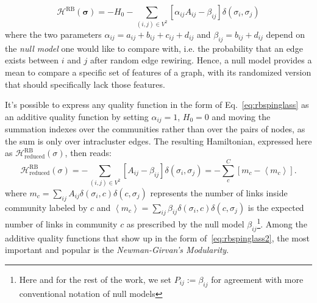 \begin{equation}\label{eq:rbspinglass}
\mathcal{H}^{\textrm{RB}}(\boldsymbol \sigma) = -H_0 - \sum \limits_{(i,j)\in V^2} \left[ \alpha_{ij} A_{ij} - \beta_{ij} \right] \delta(\sigma_i,\sigma_j)
\end{equation}
where the two parameters $\alpha_{ij}=a_{ij}+b_{ij}+c_{ij}+d_{ij}$ and $\beta_{ij}=b_{ij}+d_{ij}$ depend on the \emph{null model} one would like to compare with, i.e. the probability that an edge exists between $i$ and $j$ after random edge rewiring. Hence, a null model provides a mean to compare a specific set of features of a graph, with its randomized version that should specifically lack those features.

It's possible to express any quality function in the form of Eq.~\ref{eq:rbspinglass} as an additive quality function by setting $\alpha_{ij}=1$, $H_0=0$ and moving the summation indexes over the communities rather than over the pairs of nodes, as the sum is only over intracluster edges. The resulting Hamiltonian, expressed here as $\mathcal{H}^{\textrm{RB}}_{\textrm{reduced}}(\sigma)$, then reads:
\begin{equation}\label{eq:rbspinglass2}
\mathcal{H}^{\textrm{RB}}_{\textrm{reduced}}(\sigma) = -\sum_{(i,j) \in V^2} \left[ A_{ij} - \beta_{ij} \right] \delta(\sigma_i,\sigma_j) = - \sum \limits_{c}^C \left[ m_c - \left< m_c \right> \right].
\end{equation}
where $m_c=\sum_{ij}A_{ij}\delta(\sigma_i,c)\delta(c,\sigma_j)$ represents the number of links inside community labeled by $c$ and $\left <m_c \right >=\sum_{ij}\beta_{ij}\delta(\sigma_i,c)\delta(c,\sigma_j)$ is the expected number of links in community $c$ as prescribed by the null model $\beta_{ij}$\footnote{Here and for the rest of the work, we set $P_{ij}:=\beta_{ij}$ for agreement with more conventional notation of null models}. 
Among the additive quality functions that show up in the form of~\ref{eq:rbspinglass2}, the most important and popular is the \emph{Newman-Girvan's Modularity}.


